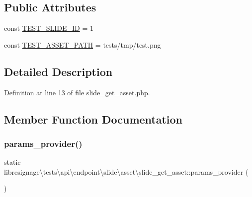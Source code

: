 \subsection*{Public Attributes}
\begin{DoxyCompactItemize}
\item 
const \hyperlink{classlibresignage_1_1tests_1_1api_1_1endpoint_1_1slide_1_1asset_1_1slide__get__asset_a5c46490c66defcfe4c38a7deb6dac133}{T\+E\+S\+T\+\_\+\+S\+L\+I\+D\+E\+\_\+\+ID} = \textquotesingle{}1\textquotesingle{}
\item 
const \hyperlink{classlibresignage_1_1tests_1_1api_1_1endpoint_1_1slide_1_1asset_1_1slide__get__asset_a66c50d433b4c524a30c1bff8c4b1e00d}{T\+E\+S\+T\+\_\+\+A\+S\+S\+E\+T\+\_\+\+P\+A\+TH} = \textquotesingle{}tests/tmp/test.\+png\textquotesingle{}
\end{DoxyCompactItemize}


\subsection{Detailed Description}


Definition at line 13 of file slide\+\_\+get\+\_\+asset.\+php.



\subsection{Member Function Documentation}
\mbox{\label{classlibresignage_1_1tests_1_1api_1_1endpoint_1_1slide_1_1asset_1_1slide__get__asset_af4e6c646b97458da24e69c9574a5ba23}} 
\subsubsection{\texorpdfstring{params\+\_\+provider()}{params\_provider()}}
{\footnotesize\ttfamily static libresignage\textbackslash{}tests\textbackslash{}api\textbackslash{}endpoint\textbackslash{}slide\textbackslash{}asset\textbackslash{}slide\+\_\+get\+\_\+asset\+::params\+\_\+provider (\begin{DoxyParamCaption}{ }\end{DoxyParamCaption})\hspace{0.3cm}{\ttfamily [static]}}



